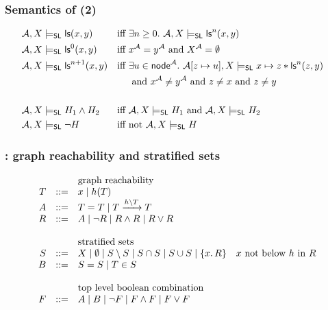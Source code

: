 \documentclass{beamer}
\begin{document}
\begin{frame}
  \frametitle{Semantics of \JoshLogic (2)}

{\small
\begin{align*}
 &\tightmodelsStandard{\liste{x}{y}}&
\text{iff  }& \exists n \ge 0. \ \tightmodelsStandard{\listen{x}{y}{n}} \\
 &\tightmodelsStandard{\listen{x}{y}{0}}&
\text{iff  }& x^\alg = y^\alg \text{ and } X^\alg = \emptyset \\
 &\tightmodelsStandard{\listen{x}{y}{n+1}}&
\text{iff  }& \exists u \in \nodesort^\alg. \ \tightmodels{\alg[z \mapsto u]}{X}{x \mapsto z * \listen{z}{y}{n}} \\
  &  &  & \text{ and } x^\alg \neq y^\alg \text{ and } z \neq x \text{ and } z \neq y \\
 & & & & \\
 &\tightmodelsStandard{H_1 \land H_2}&
\text{iff  }&  \tightmodelsStandard{H_1} \text{ and } \tightmodelsStandard{H_2} \\
 &\tightmodelsStandard{\neg H}&
\text{iff  }&  \text{not } \tightmodelsStandard{H}
\end{align*}
}

\end{frame}

\begin{frame}
  \frametitle{\LRJQ: graph reachability and stratified sets}

\begin{equation*}
\begin{array}{rcl}
  & & \text{graph reachability} \\
  T & ::= & x \mid h(T) \\
  A & ::= & T = T \mid T \xrightarrow{h \setminus T} T \\
  R & ::= & A \mid \neg R \mid R \land R \mid R \lor R \\
   & & \\
  & & \text{stratified sets} \\
  S & ::= & X \mid \emptyset \mid S \setminus S \mid S \cap S \mid S \cup S \mid \{x.\,R\} \quad \text{$x$ not below $h$ in $R$} \\
  B & ::= & S = S \mid T \in S \\
   & & \\
  & & \text{top level boolean combination} \\
  F & ::= & A \mid B \mid \lnot F \mid F \land F \mid F \lor F 
  \end{array} 
\end{equation*}

\end{frame}
\end{document}
